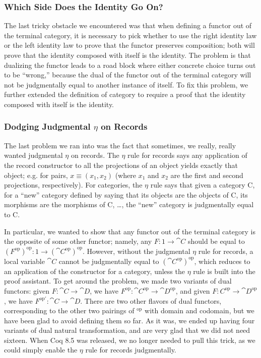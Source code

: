     \subsubsection{Which Side Does the Identity Go On?}
      The last tricky obstacle we encountered was that when defining a functor out of the terminal category, it is necessary to pick whether to use the right identity law or the left identity law to prove that the functor preserves composition; both will prove that the identity composed with itself is the identity.
      The problem is that dualizing the functor leads to a road block where either concrete choice turns out to be ``wrong,'' because the dual of the functor out of the terminal category will not be judgmentally equal to another instance of itself.
      To fix this problem, we further extended the definition of category to require a proof that the identity composed with itself is the identity.

    \subsubsection{Dodging Judgmental \texorpdfstring{$\eta$}{η} on Records}  \label{sec:no-judgmental-eta}
      The last problem we ran into was the fact that sometimes, we really, really wanted judgmental $\eta$ on records.
      The $\eta$ rule for records says any application of the record constructor to all the projections of an object yields exactly that object; e.g. for pairs, $x \equiv (x_1, x_2)$ (where $x_1$ and $x_2$ are the first and second projections, respectively).
      For categories, the $\eta$ rule says that given a category \cat C, for a ``new'' category defined by saying that its objects are the objects of \cat C, its morphisms are the morphisms of \cat C, \ldots, the ``new'' category is judgmentally equal to \cat C.

      In particular, we wanted to show that any functor out of the terminal category is the opposite of some other functor; namely, any $F : 1 \to \cat C$ should be equal to $(F^{\text{op}})^{\text{op}} : 1 \to (\cat C^{\text{op}})^{\text{op}}$.
      However, without the judgmental $\eta$ rule for records, a local variable $\cat C$ cannot be judgmentally equal to $(\cat C^{\text{op}})^{\text{op}}$, which reduces to an application of the constructor for a category, unless the $\eta$ rule is built into the proof assistant.
      To get around the problem, we made two variants of dual functors: given $F : \cat C \to \cat D$, we have $F^{\text{op}} : \cat C^{\text{op}} \to \cat D^{\text{op}}$, and given $F : C^{\text{op}} \to \cat D^{\text{op}}$, we have $F^{\text{op}'} : \cat C \to \cat D$.
      There are two other flavors of dual functors, corresponding to the other two pairings of ${}^{\text{op}}$ with domain and codomain, but we have been glad to avoid defining them so far.  As it was, we ended up having four variants of dual natural transformation, and are very glad that we did not need sixteen.
      When Coq 8.5 was released, we no longer needed to pull this trick, as we could simply enable the $\eta$ rule for records judgmentally.



